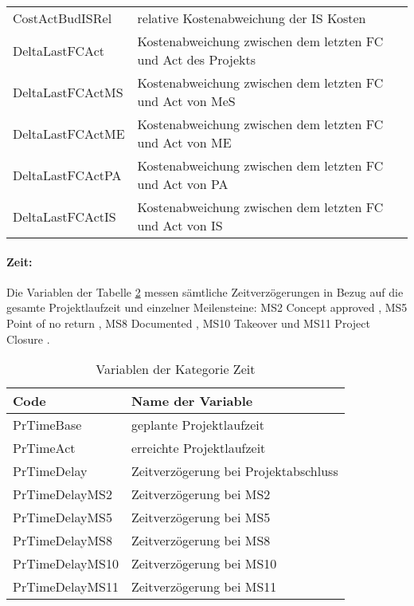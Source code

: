 \begin{table}[htbp]
\begin{tabular}{ll}
		CostActBudISRel & relative Kostenabweichung der IS Kosten \\
		DeltaLastFCAct & Kostenabweichung zwischen dem letzten FC und Act des Projekts \\
		DeltaLastFCActMS & Kostenabweichung zwischen dem letzten FC und Act von MeS \\
		DeltaLastFCActME & Kostenabweichung zwischen dem letzten FC und Act von ME \\
		DeltaLastFCActPA & Kostenabweichung zwischen dem letzten FC und Act von PA \\
		DeltaLastFCActIS & Kostenabweichung zwischen dem letzten FC und Act von IS \\
		\bottomrule
	\end{tabular}%
	\label{tab:costvar}%
\end{table}%
\paragraph{Zeit:} Die Variablen der Tabelle \ref{tab:zeitvar} messen sämtliche Zeitverzögerungen in Bezug auf die gesamte Projektlaufzeit und einzelner Meilensteine: MS2 \glqq Concept approved \grqq{ }, MS5 \glqq Point of no return \grqq{ }, MS8 \glqq Documented \grqq{ }, MS10 \glqq Takeover\grqq{ } und MS11 \glqq Project Closure \grqq{ }.
\begin{table}[htbp]
	\centering
	\caption{Variablen der Kategorie Zeit}
	\begin{tabular}{ll}
		\toprule
		\textbf{Code} & \textbf{Name der Variable} \\
		\midrule
		PrTimeBase & geplante Projektlaufzeit \\
		PrTimeAct & erreichte Projektlaufzeit \\
		PrTimeDelay & Zeitverzögerung bei Projektabschluss \\
		PrTimeDelayMS2 & Zeitverzögerung bei MS2 \\
		PrTimeDelayMS5 & Zeitverzögerung bei MS5 \\
		PrTimeDelayMS8 & Zeitverzögerung bei MS8 \\
		PrTimeDelayMS10 & Zeitverzögerung bei MS10 \\
		PrTimeDelayMS11 & Zeitverzögerung bei MS11 \\
		\bottomrule
	\end{tabular}%
	\label{tab:zeitvar}%
\end{table}%

